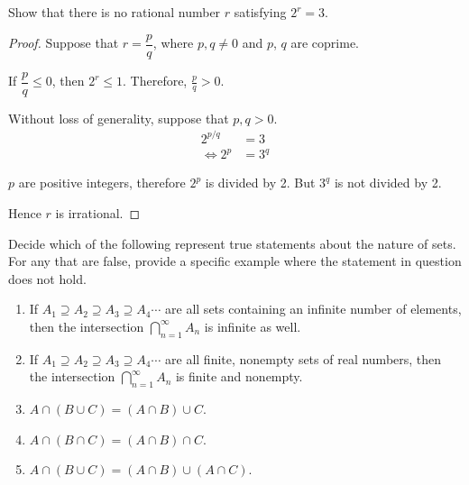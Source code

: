 \documentclass[class=understanding-analysis,crop=false]{standalone}
\begin{document}
\begin{exercise}
    \par Show that there is no rational number $r$ satisfying $2^{r} = 3$.
\end{exercise}

\begin{proof}
    \par Suppose that $r = \dfrac{p}{q}$, where $p, q\ne 0$ and $p$, $q$ are coprime.
    \par If $\dfrac{p}{q} \le 0$, then $2^{r} \le 1$. Therefore, $\frac{p}{q} > 0$.
    \par Without loss of generality, suppose that $p, q > 0$.
    \begin{align*}
        2^{p/q}                   & = 3     \\
        \Longleftrightarrow 2^{p} & = 3^{q}
    \end{align*}
    \par $p$ are positive integers, therefore $2^{p}$ is divided by 2. But $3^{q}$ is not divided by 2.
    \par Hence $r$ is irrational.
\end{proof}

\begin{exercise}
    \par Decide which of the following represent true statements about the nature of sets. For any that are false, provide a specific example where the statement in question does not hold.
    \begin{enumerate}[label = (\alph*)]
        \item If $A_{1}\supseteq A_{2}\supseteq A_{3}\supseteq A_{4} \cdots$ are all sets containing an infinite number of elements, then the intersection $\bigcap^{\infty}_{n=1}A_{n}$ is infinite as well.
        \item If $A_{1}\supseteq A_{2}\supseteq A_{3}\supseteq A_{4} \cdots$ are all finite, nonempty sets of real numbers, then the intersection $\bigcap^{\infty}_{n=1}A_{n}$ is finite and nonempty.
        \item $A\cap (B\cup C) = (A\cap B)\cup C$.
        \item $A\cap (B\cap C) = (A\cap B)\cap C$.
        \item $A\cap (B\cup C) = (A\cap B)\cup (A\cap C)$.
    \end{enumerate}
\end{exercise}
\end{document}
